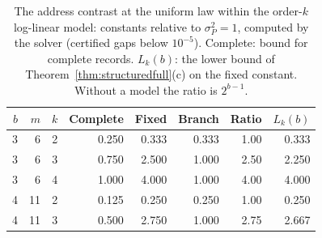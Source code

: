 \begin{table}[h]
\centering
\caption{The address contrast at the uniform law within the order-$k$ log-linear model: constants relative to $\sigma_P^2=1$, computed by the solver (certified gaps below $10^{-5}$). Complete: bound for complete records. $L_k(b)$: the lower bound of Theorem~\ref{thm:structuredfull}(c) on the fixed constant. Without a model the ratio is $2^{b-1}$.}
\label{tab:addressmodel}
\small
\begin{tabular}{rrrrrrrr}
\toprule
$b$ & $m$ & $k$ & Complete & Fixed & Branch & Ratio & $L_k(b)$ \\
\midrule
3 & 6 & 2 & 0.250 & 0.333 & 0.333 & 1.00 & 0.333 \\
3 & 6 & 3 & 0.750 & 2.500 & 1.000 & 2.50 & 2.250 \\
3 & 6 & 4 & 1.000 & 4.000 & 1.000 & 4.00 & 4.000 \\
4 & 11 & 2 & 0.125 & 0.250 & 0.250 & 1.00 & 0.250 \\
4 & 11 & 3 & 0.500 & 2.750 & 1.000 & 2.75 & 2.667 \\
\bottomrule
\end{tabular}
\end{table}
